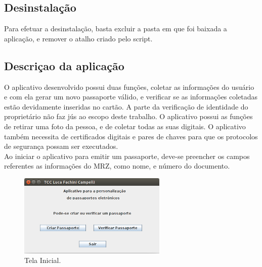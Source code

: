 \documentclass{article}
\begin{document}
		\subsection{Desinstalação}
			\begin{justify}
			\hspace{2cm} Para efetuar a desinstalação, basta excluir a pasta em que foi baixada a aplicação, e remover o atalho criado pelo script.
			\end{justify}

		\subsection{Descriçao da aplicação}
			\begin{justify}
				\hspace{2cm} O aplicativo desenvolvido possui duas funções, coletar as informações do usuário e com ela gerar um novo passaporte válido, e verificar se as informações coletadas estão devidamente inseridas no cartão. A parte da verificação de identidade do proprietário não faz jús ao escopo deste trabalho. O aplicativo possui as funções de retirar uma foto da pessoa, e de coletar todas as suas digitais. O aplicativo também necessita de certificados digitais e pares de chaves para que os protocolos de segurança possam ser executados.\\
				\hspace*{2cm} Ao iniciar o aplicativo para emitir um passaporte, deve-se preencher os campos referentes as informações do MRZ, como nome, e número do documento. 

				\begin{figure}
				  \includegraphics[width=200pt]{TelaInicial.png}
				  \caption{Tela Inicial.}
				  \label{fig:telainicial}
				\end{figure}


\end{justify}
\end{document}
